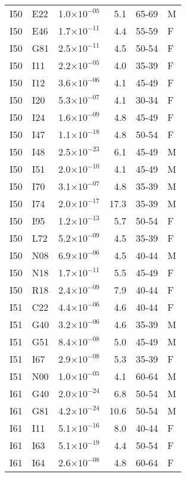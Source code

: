 \begin{longtable}{lllrll}
   I50 & E22 & 1.0$\times10^{-05}$ & 5.1 & 65-69 & M \\ 
   I50 & E46 & 1.7$\times10^{-11}$ & 4.4 & 55-59 & F \\ 
   I50 & G81 & 2.5$\times10^{-11}$ & 4.5 & 50-54 & F \\ 
   I50 & I11 & 2.2$\times10^{-05}$ & 4.0 & 35-39 & F \\ 
   I50 & I12 & 3.6$\times10^{-06}$ & 4.1 & 45-49 & F \\ 
   I50 & I20 & 5.3$\times10^{-07}$ & 4.1 & 30-34 & F \\ 
   I50 & I24 & 1.6$\times10^{-09}$ & 4.8 & 45-49 & F \\ 
   I50 & I47 & 1.1$\times10^{-18}$ & 4.8 & 50-54 & F \\ 
   I50 & I48 & 2.5$\times10^{-23}$ & 6.1 & 45-49 & M \\ 
   I50 & I51 & 2.0$\times10^{-10}$ & 4.1 & 45-49 & M \\ 
   I50 & I70 & 3.1$\times10^{-07}$ & 4.8 & 35-39 & M \\ 
   I50 & I74 & 2.0$\times10^{-17}$ & 17.3 & 35-39 & M \\ 
   I50 & I95 & 1.2$\times10^{-13}$ & 5.7 & 50-54 & F \\ 
   I50 & L72 & 5.2$\times10^{-09}$ & 4.5 & 35-39 & F \\ 
   I50 & N08 & 6.9$\times10^{-06}$ & 4.5 & 40-44 & M \\ 
   I50 & N18 & 1.7$\times10^{-11}$ & 5.5 & 45-49 & F \\ 
   I50 & R18 & 2.4$\times10^{-09}$ & 7.9 & 40-44 & F \\ 
   I51 & C22 & 4.4$\times10^{-06}$ & 4.6 & 40-44 & F \\ 
   I51 & G40 & 3.2$\times10^{-06}$ & 4.6 & 35-39 & M \\ 
   I51 & G51 & 8.4$\times10^{-08}$ & 5.0 & 45-49 & M \\ 
   I51 & I67 & 2.9$\times10^{-08}$ & 5.3 & 35-39 & F \\ 
   I51 & N00 & 1.0$\times10^{-05}$ & 4.1 & 60-64 & M \\ 
   I61 & G40 & 2.0$\times10^{-24}$ & 6.8 & 50-54 & M \\ 
   I61 & G81 & 4.2$\times10^{-24}$ & 10.6 & 50-54 & M \\ 
   I61 & I11 & 5.1$\times10^{-16}$ & 8.0 & 40-44 & F \\ 
   I61 & I63 & 5.1$\times10^{-19}$ & 4.4 & 50-54 & F \\ 
   I61 & I64 & 2.6$\times10^{-08}$ & 4.8 & 60-64 & F \\ 

\end{longtable}
